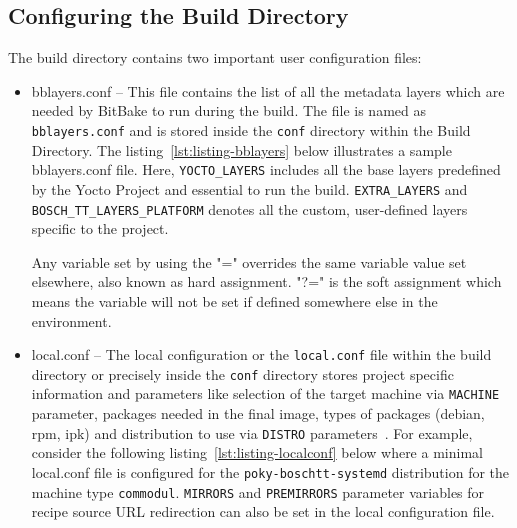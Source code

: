 \subsection{Configuring the Build Directory}

The build directory contains two important user configuration files:

\begin{itemize}
 
\item{bblayers.conf} – This file contains the list of all the metadata layers which are needed by BitBake to run during the build. The file is named as \texttt{bblayers.conf} and is stored inside the \texttt{conf} directory within the Build Directory. The listing~\ref{lst:listing-bblayers} below illustrates a sample bblayers.conf file. Here, \texttt{YOCTO\_LAYERS} includes all the base layers predefined by the Yocto Project and essential to run the build. \texttt{EXTRA\_LAYERS} and \texttt{BOSCH\_TT\_LAYERS\_PLATFORM} denotes all the custom, user-defined layers specific to the project. 

\vspace{0.5cm}
\lstset{style=mystyle}

\vspace{0.5cm}

Any variable set by using the "=" overrides the same variable value set elsewhere, also known as hard assignment. "?=" is the soft assignment which means the variable will not be set if defined somewhere else in the environment.


\item{local.conf} – The local configuration or the \texttt{local.conf} file within the build directory or precisely inside the \texttt{conf} directory stores project specific information and  parameters like selection of the target machine via \texttt{MACHINE} parameter, packages needed in the final image, types of packages (debian, rpm, ipk) and distribution to use via \texttt{DISTRO} parameters~\parencite{swain2015design}. For example, consider the following listing~\ref{lst:listing-localconf} below where a minimal local.conf file is configured for the \texttt{poky-boschtt-systemd} distribution for the machine type \texttt{commodul}. \texttt{MIRRORS} and \texttt{PREMIRRORS} parameter variables for recipe source \ac{URL} redirection can also be set in the local configuration file.

\vspace{0.5cm}
\lstset{style=mystyle}


\vspace{0.5cm}
\end{itemize}

